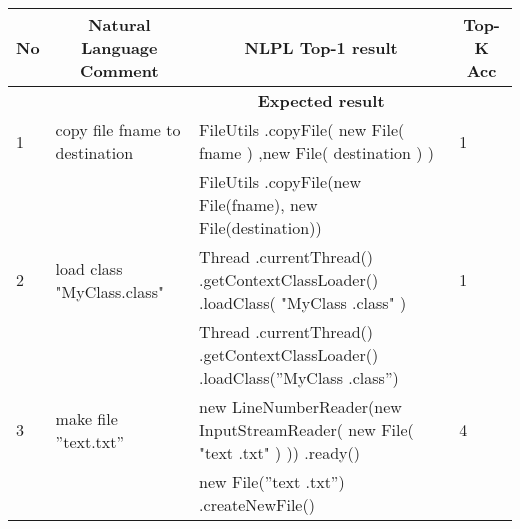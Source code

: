 \begin{longtable}{|p{}|p{}|p{}|p{}|}
		\hline
		\multicolumn{1}{|c|}{\textbf{No}} & \multicolumn{1}{c|}{\textbf{Natural Language Comment}} & \multicolumn{1}{c|}{\cellcolor[HTML]{FFCCC9}\textbf{NLPL Top-1 result}}                                          & \multicolumn{1}{c|}{\textbf{Top-K Acc}} \\ \hline
		&                                                        & \multicolumn{1}{c|}{\cellcolor[HTML]{9AFF99}\textbf{Expected result}}                                            &                                         \\ \hline
		\rowcolor[HTML]{FFCCC9} 
		1                                 & copy file fname to destination                         & FileUtils .copyFile( new File( fname ) ,new File( destination ) )                                                & 1                                       \\ \hline
		\rowcolor[HTML]{9AFF99} 
		&                                                        & FileUtils .copyFile(new File(fname), new File(destination))                                                      &                                         \\ \hline
		\rowcolor[HTML]{FFCCC9} 
		2                                 & load class "MyClass.class"                             & Thread .currentThread() .getContextClassLoader() .loadClass( "MyClass .class" )                                  & 1                                       \\ \hline
		\rowcolor[HTML]{9AFF99} 
		&                                                        & Thread .currentThread() .getContextClassLoader() .loadClass(”MyClass .class”)                                    &                                         \\ \hline
		\rowcolor[HTML]{FFCCC9} 
		3                                 & make file ”text.txt”                                   & new LineNumberReader(new InputStreamReader( new File( "text .txt" ) )) .ready()                                  & 4                                       \\ \hline
		\rowcolor[HTML]{9AFF99} 
		&                                                        & new File(”text .txt”) .createNewFile()                                                                           &                                         \\ \hline

\end{longtable}
